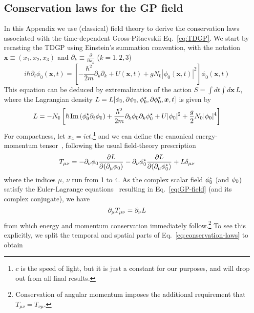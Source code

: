 \begin{subappendices}
\section{Conservation laws for the GP field}
\label{app:field-theory}
%
In this Appendix we use (classical) field theory to derive the
conservation laws associated with the time-dependent Gross-Pitaevskii
Eq.~\eqref{eq:TDGP}. We start by recasting the TDGP using Einstein's
summation convention, with the notation $\bm{x} \equiv (x_1, x_2,
x_3)$ and $\partial_k \equiv \frac{\partial}{\partial x_k}$ ($k =
1,2,3$)
%
\begin{equation}\label{eq:GP-field}
    i\hbar\partial_t\phi_0(\bm{x},t) = 
  \left[-\frac{\hbar^2}{2m}\partial_k\partial_k + U(\bm{x},t) + g N_0 |\phi_0(\bm{x},t)|^2\right]\phi_0(\bm{x},t)
\end{equation}
% 
This equation can be deduced by extremalization of the action
$S = \int dt \int d\bm{x} \,L$, where the Lagrangian density
$L = L[\phi_{0}, \partial \phi_{0}, \phi_{0}^{\star}, \partial \phi_{0}^{\star}, \bm{x}, t]$ is given by
%
\begin{equation}\label{eq:GP-action}
  L = -N_0\left[\hbar \operatorname{Im}\left(\phi_{0}^{\star} \partial_t \phi_{0}\right) + 
\frac{\hbar^2}{2m}\partial_k\phi_{0}\partial_k\phi_{0}^{\star} + U\vert \phi_{0} \vert^2 + \frac{g}{2}N_0\vert \phi_{0} \vert^4 \right]
\end{equation}
% 
For compactness, let $x_4 = i c t$,\footnote{$c$ is the speed of
  light, but it is just a constant for our purposes, and will drop out
  from all final results.}  and we can define the canonical
energy-momentum tensor~\cite{Landau:101807}, following the usual
field-theory prescription~\cite{wentzel2003quantum}
%
\begin{equation}\label{eq:en-mom-tensor}
  T_{\mu \nu} = - \partial_{\nu} \phi_{0} \frac{\partial L}{\partial (\partial_{\mu} \phi_{0})} - \partial_{\nu} \phi_{0}^{\star} \frac{\partial L}{\partial (\partial_{\mu} \phi_{0}^{\star})} + L \delta_{\mu \nu}
\end{equation}
% 
where the indices $\mu,\,\nu$ run from 1 to 4. As the complex scalar
field $\phi_{0}^{\star}$ (and $\phi_{0}$) satisfy the Euler-Lagrange
equations~\cite{Landau:101804} resulting in Eq.~\eqref{eq:GP-field}
(and its complex conjugate), we have
%
\begin{equation}\label{eq:conservation-laws}
  \partial_{\mu} T_{\mu\nu} = \partial_{\nu} L
\end{equation}
% 
from which energy and momentum conservation immediately
follow.\footnote{Conservation of angular momentum imposes the
  additional requirement that $T_{\mu\nu} = T_{\nu\mu}$.}
%
To see this explicitly, we split the temporal and spatial parts of
Eq.~\eqref{eq:conservation-laws} to obtain

\end{subappendices}
